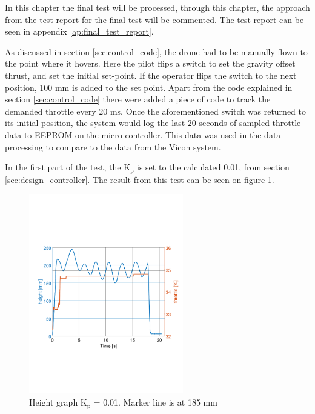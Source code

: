In this chapter the final test will be processed, through this chapter, the approach from the test report for the final test will be commented. The test report can be seen in appendix \ref{ap:final_test_report}.


As discussed in section \ref{sec:control_code}, the drone had to be manually flown to the point where it hovers. Here the pilot flips a switch to set the gravity offset thrust, and set the initial set-point. If the operator flips the switch to the next position, 100 mm is added to the set point. Apart from the code explained in section \ref{sec:control_code} there were added a piece of code to track the demanded throttle every 20 ms. Once the aforementioned switch was returned to its initial position, the system would log the last 20 seconds of sampled throttle data to EEPROM on the micro-controller. This data was used in the data processing to compare to the data from the Vicon system.

In the first part of the test, the K$_\text{p}$ is set to the calculated 0.01, from section \ref{sec:design_controller}. The result from this test can be seen on figure \ref{fig:first_test_report}.

\begin{figure}[H]
    \centering
    \includegraphics[width=0.6\textwidth, trim={0 7cm 0 7cm},clip]{figures/Appendix/final_test/kp0,012.pdf}
    \caption{Height graph K$_\text{p}$ = 0.01. Marker line is at 185 mm}
    \label{fig:first_test_report}
\end{figure}

